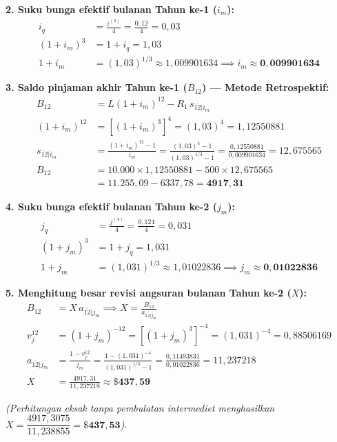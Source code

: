 \documentclass[11pt,a4paper]{article}
\begin{document}
\textbf{2. Suku bunga efektif bulanan Tahun ke-1 ($i_m$):}
\begin{align*}
    i_q &= \frac{i^{(4)}}{4} = \frac{0{,}12}{4} = 0{,}03 \\[0.3em]
    (1 + i_m)^3 &= 1 + i_q = 1{,}03 \\[0.3em]
    1 + i_m &= (1{,}03)^{1/3} \approx 1{,}009901634 \implies i_m \approx \mathbf{0{,}009901634}
\end{align*}

\textbf{3. Saldo pinjaman akhir Tahun ke-1 ($B_{12}$) --- Metode Retrospektif:}
\begin{align*}
    B_{12} &= L(1 + i_m)^{12} - R_1 \, s_{\overline{12}|i_m} \\[0.3em]
    (1 + i_m)^{12} &= \left[(1 + i_m)^3\right]^4 = (1{,}03)^4 = 1{,}12550881 \\[0.3em]
    s_{\overline{12}|i_m} &= \frac{(1 + i_m)^{12} - 1}{i_m} = \frac{(1{,}03)^4 - 1}{(1{,}03)^{1/3} - 1} = \frac{0{,}12550881}{0{,}009901634} = 12{,}675565 \\[0.3em]
    B_{12} &= 10.000 \times 1{,}12550881 - 500 \times 12{,}675565 \\[0.3em]
    &= 11.255{,}09 - 6337{,}78 = \mathbf{4917{,}31}
\end{align*}

\textbf{4. Suku bunga efektif bulanan Tahun ke-2 ($j_m$):}
\begin{align*}
    j_q &= \frac{j^{(4)}}{4} = \frac{0{,}124}{4} = 0{,}031 \\[0.3em]
    (1 + j_m)^3 &= 1 + j_q = 1{,}031 \\[0.3em]
    1 + j_m &= (1{,}031)^{1/3} \approx 1{,}01022836 \implies j_m \approx \mathbf{0{,}01022836}
\end{align*}

\textbf{5. Menghitung besar revisi angsuran bulanan Tahun ke-2 ($X$):}
\begin{align*}
    B_{12} &= X \, a_{\overline{12}|j_m} \implies X = \frac{B_{12}}{a_{\overline{12}|j_m}} \\[0.3em]
    v_j^{12} &= (1 + j_m)^{-12} = \left[(1 + j_m)^3\right]^{-4} = (1{,}031)^{-4} = 0{,}88506169 \\[0.3em]
    a_{\overline{12}|j_m} &= \frac{1 - v_j^{12}}{j_m} = \frac{1 - (1{,}031)^{-4}}{(1{,}031)^{1/3} - 1} = \frac{0{,}11493831}{0{,}01022836} = 11{,}237218 \\[0.3em]
    X &= \frac{4917{,}31}{11{,}237218} \approx \mathbf{\$437{,}59}
\end{align*}

\textit{(Perhitungan eksak tanpa pembulatan intermediet menghasilkan $X = \dfrac{4917{,}3075}{11{,}238855} = \mathbf{\$437{,}53}$)}.
\end{document}
